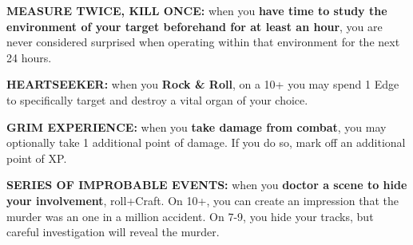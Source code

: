 \documentclass[oneside,10pt]{article}
\begin{document}
\begin{multicols}{2}
\textbf{MEASURE TWICE, KILL ONCE:} when you
\textbf{have time to study the environment of your
  target beforehand for at least an hour}, you are
never considered surprised when operating within
that environment for the next 24 hours.

\textbf{HEARTSEEKER:} when you \textbf{Rock \&
  Roll}, on a 10+ you may spend 1 Edge to specifically target and
destroy a vital organ of your choice.

\textbf{GRIM EXPERIENCE:} when you \textbf{take damage
from combat}, you may optionally take 1 additional
point of damage. If you do so, mark off an
additional point of XP.

\textbf{SERIES OF IMPROBABLE EVENTS:} when you
\textbf{doctor a scene to hide your involvement},
roll+Craft. On 10+, you can create an impression
that the murder was an one in a million
accident. On 7-9, you hide your tracks, but
careful investigation will reveal the murder.


\end{multicols}

\end{document}

